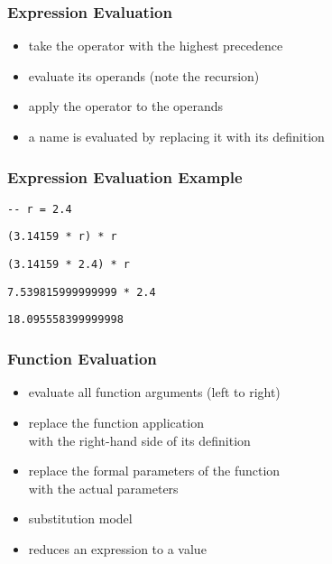 \documentclass[dvipsnames]{beamer}
\theoremstyle{plain}
\begin{document}
\begin{frame}
  \frametitle{Expression Evaluation}

  \begin{itemize}
    \item take the operator with the highest precedence
    \item evaluate its operands (note the recursion)
    \item apply the operator to the operands

    \medskip
    \item a name is evaluated by replacing it with its definition
  \end{itemize}
\end{frame}

\begin{frame}
  \frametitle{Expression Evaluation Example}

  \begin{exampleblock}{}
    \lstinline|-- r = 2.4|
    \medskip

    \lstinline|(3.14159 * r) * r|

    \pause
    \medskip
    \lstinline|(3.14159 * 2.4) * r|

    \pause
    \medskip
    \lstinline|7.539815999999999 * 2.4|

    \pause
    \medskip
    \lstinline|18.095558399999998|
  \end{exampleblock}
\end{frame}

\begin{frame}
  \frametitle{Function Evaluation}

  \begin{itemize}
    \item evaluate all function arguments (left to right)
    \item replace the function application\\
      with the right-hand side of its definition
    \item replace the formal parameters of the function\\
      with the actual parameters

    \pause
    \bigskip
    \item substitution model
    \item reduces an expression to a value
  \end{itemize}
\end{frame}
\end{document}
